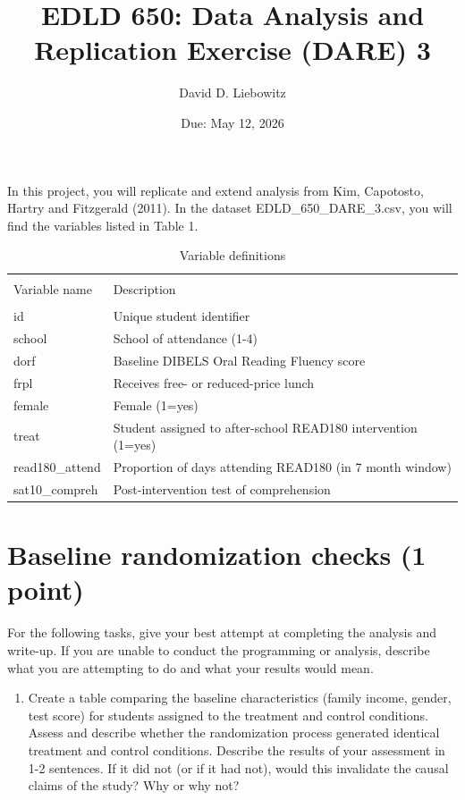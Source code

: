 \documentclass[a4paper, 11pt]{article}
\title{EDLD 650: Data Analysis and Replication Exercise (DARE) 3}
\author{David D. Liebowitz}
\date{Due: May 12, 2026}
\begin{document}
\maketitle

In this project, you will replicate and extend analysis from Kim, Capotosto, Hartry and Fitzgerald (2011). In the dataset EDLD\_650\_DARE\_3.csv, you will find the variables listed in Table 1. 

\begin{table}[!htbp] \centering 
  \caption{Variable definitions} 
  \label{} 
\begin{tabular}{ll} 
\\[-1.8ex]\hline 
\\[-1.8ex] Variable name & Description \\ 
\hline \\[-1.8ex]
id & Unique student identifier \\
school & School of attendance (1-4) \\
dorf & Baseline DIBELS Oral Reading Fluency score \\
frpl & Receives free- or reduced-price lunch \\
female & Female (1=yes) \\
treat & Student assigned to after-school READ180 intervention (1=yes) \\
read180\_attend & Proportion of days attending READ180 (in 7 month window) \\
sat10\_compreh & Post-intervention test of comprehension \\

\hline
\hline

\end{tabular}
\end{table}

\section{Baseline randomization checks (1 point)}
For the following tasks, give your best attempt at completing the analysis and write-up. If you are unable to conduct the programming or analysis, describe what you are attempting to do and what your results would mean.

\begin{enumerate}
	\item[A1.] Create a table comparing the baseline characteristics (family income, gender, test score) for students assigned to the treatment and control conditions. Assess and describe whether the randomization process generated identical treatment and control conditions. Describe the results of your assessment in 1-2 sentences. If it did not (or if it had not), would this invalidate the causal claims of the study? Why or why not?

\end{enumerate}
\end{document}

